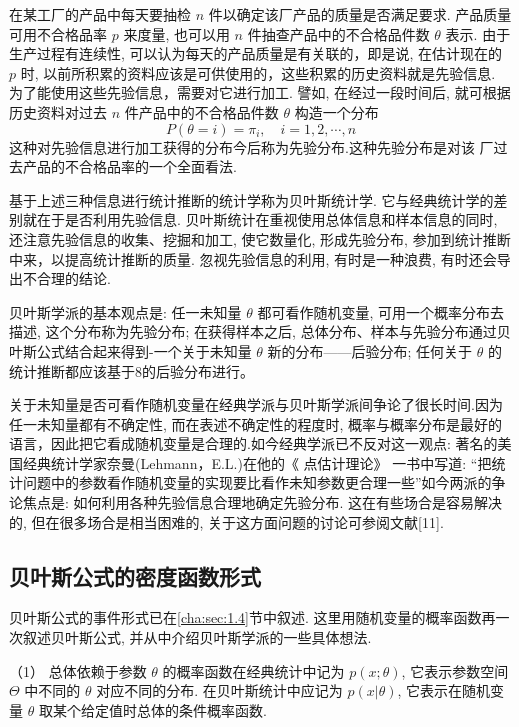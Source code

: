 \begin{example}\label{exam:6.4.1}
在某工厂的产品中每天要抽检 $n$ 件以确定该厂产品的质量是否满足要求. 产品质量可用不合格品率 $p$ 来度量, 也可以用 $n$ 件抽查产品中的不合格品件数 $\theta$ 表示. 由于生产过程有连续性, 可以认为每天的产品质量是有关联的，即是说, 在估计现在的 $p$ 时, 以前所积累的资料应该是可供使用的，这些积累的历史资料就是先验信息. 为了能使用这些先验信息，需要对它进行加工. 譬如, 在经过一段时间后, 就可根据历史资料对过去 $n$ 件产品中的不合格品件数 $\theta$ 构造一个分布
\begin{equation}\label{eq:6.4.1}
P(\theta=i)=\pi_{i}, \quad i=1,2, \cdots, n
\end{equation}
这种对先验信息进行加工获得的分布今后称为先验分布.这种先验分布是对该
厂过去产品的不合格品率的一个全面看法.
\end{example}
基于上述三种信息进行统计推断的统计学称为贝叶斯统计学. 它与经典统计学的差别就在于是否利用先验信息. 贝叶斯统计在重视使用总体信息和样本信息的同时, 还注意先验信息的收集、挖掘和加工, 使它数量化, 形成先验分布, 参加到统计推断中来，以提高统计推断的质量. 忽视先验信息的利用, 有时是一种浪费, 有时还会导出不合理的结论.

贝叶斯学派的基本观点是: {\heiti 任一未知量 $\theta$ 都可看作随机变量, 可用一个概率分布去描述, 这个分布称为先验分布}; 在获得样本之后, 总体分布、样本与先验分布通过贝叶斯公式结合起来得到-一个关于未知量 $\theta$ 新的分布——后验分布; 任何关于 $\theta$ 的统计推断都应该基于8的后验分布进行。

关于未知量是否可看作随机变量在经典学派与贝叶斯学派间争论了很长时间.因为任一未知量都有不确定性, 而在表述不确定性的程度时, 概率与概率分布是最好的语言，因此把它看成随机变量是合理的.如今经典学派已不反对这一观点: 著名的美国经典统计学家奈曼(Lehmann，E.L.)在他的《 点估计理论》 一书中写道: “把统计问题中的参数看作随机变量的实现要比看作未知参数更合理一些”如今两派的争论焦点是: {\heiti 如何利用各种先验信息合理地确定先验分布}. 这在有些场合是容易解决的, 但在很多场合是相当困难的, 关于这方面问题的讨论可参阅文献[11].

\subsection{贝叶斯公式的密度函数形式}\label{ssec:6.4.2}

贝叶斯公式的事件形式已在\ref{cha:sec:1.4}节中叙述. 这里用随机变量的概率函数再一次叙述贝叶斯公式, 并从中介绍贝叶斯学派的一些具体想法.

  （1） 总体依赖于参数 $\theta$ 的概率函数在经典统计中记为 $p(x ; \theta)$, 它表示参数空间 $\Theta$ 中不同的 $\theta$ 对应不同的分布. 在贝叶斯统计中应记为 $p(x|\theta)$, 它表示在随机变量 $\theta$ 取某个给定值时总体的{\heiti 条件概率函数}.

